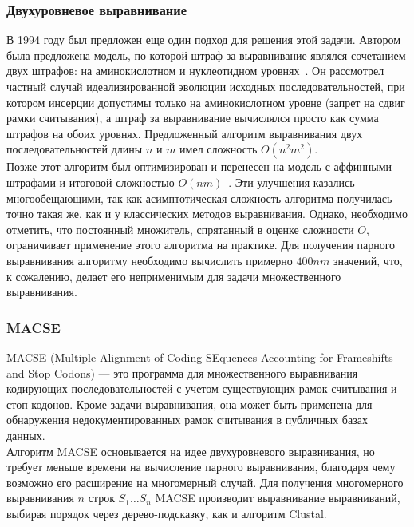 \subsubsection[Двухуровневое выравнивание]{\large Двухуровневое выравнивание} \label{NTAAalign}
\hspace{\parindent} В 1994 году был предложен еще один подход для решения этой задачи. Автором была предложена модель, по которой штраф за выравнивание являлся сочетанием двух штрафов: на аминокислотном и нуклеотидном уровнях~\cite{Hein}. Он рассмотрел частный случай идеализированной эволюции исходных последовательностей, при котором инсерции допустимы только на аминокислотном уровне (запрет на сдвиг рамки считывания), а штраф за выравнивание вычислялся просто как сумма штрафов на обоих уровнях. Предложенный алгоритм выравнивания двух последовательностей длины $n$ и $m$ имел сложность $O(n^2m^2)$.\\
\indent Позже этот алгоритм был оптимизирован и перенесен на модель с аффинными штрафами и итоговой сложностью $O(nm)$~\cite{HeinOptimize}. Эти улучшения казались многообещающими, так как асимптотическая сложность алгоритма получилась точно такая же, как и у классических методов выравнивания. Однако, необходимо отметить, что постоянный множитель, спрятанный в оценке сложности $O$, ограничивает применение этого алгоритма на практике. Для получения парного выравнивания алгоритму необходимо вычислить примерно $400nm$ значений, что, к сожалению, делает его неприменимым для задачи множественного выравнивания.

\subsubsection[MACSE]{\large MACSE}
\hspace{\parindent} MACSE (Multiple Alignment of Coding SEquences Accounting for Frameshifts and Stop Codons) --- это программа для множественного выравнивания кодирующих последовательностей с учетом существующих рамок считывания и стоп-кодонов. Кроме задачи выравнивания, она может быть применена для обнаружения недокументированных рамок считывания в публичных базах данных.\\
\indent Алгоритм MACSE основывается на идее двухуровневого выравнивания, но требует меньше времени на вычисление парного выравнивания, благодаря чему возможно его расширение на многомерный случай. Для получения многомерного выравнивания $n$ строк $S_1 \ldots S_n$ MACSE производит выравнивание выравниваний, выбирая порядок через дерево-подсказку, как и алгоритм Clustal. 